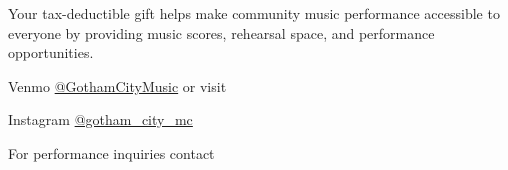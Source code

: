 \documentclass{article}[10pt]
\begin{document}
\begin{center}
\begin{minipage}{4in}
            \begin{center}
            {\textbf{}}
            \end{center}

            \vspace{-0.1in}

            \begin{small}
                Your tax-deductible gift helps make community music performance accessible to everyone by providing music scores, rehearsal space, and performance opportunities.\\
            \end{small}


            Venmo \href{https://account.venmo.com/u/GothamCityMusic}{@GothamCityMusic} or visit \textbf{}

            \begin{center}
            {\textbf{}}

                \faInstagram{}{}  Instagram  \href{https://www.instagram.com/gotham_city_mc/}{@gotham\_city\_mc}


                For performance inquiries contact
                    {\textbf{}}
            \end{center}

            \begin{center}
            {\textbf{}}
                \\


\end{center}
\end{minipage}
\end{center}
\end{document}
